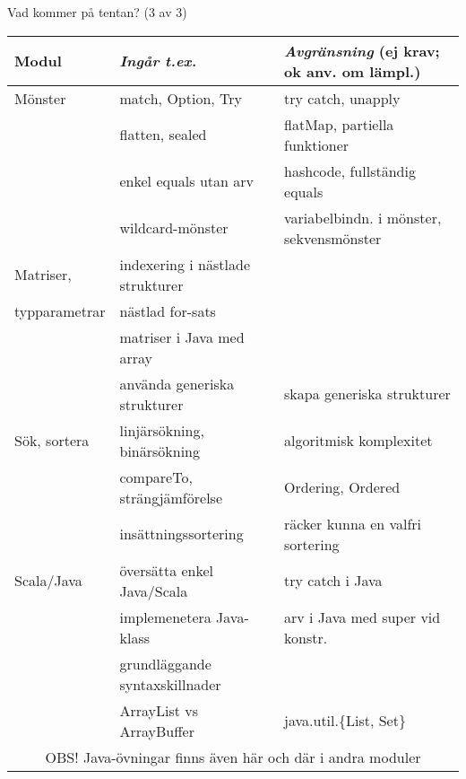 \begin{Slide}{Vad kommer på tentan? (3 av 3)}\SlideFontTiny
\hspace{-2em}\begin{minipage}{1.0\textwidth}
\begin{tabular}{l | l | l}
\textbf{Modul} & \textit{Ingår t.ex.}& \textit{Avgränsning} (ej krav; ok anv. om lämpl.)\\\hline

Mönster     & match, Option, Try & try catch, unapply\\
            & flatten, sealed            & flatMap, partiella funktioner\\
            & enkel equals utan arv     & hashcode, fullständig equals   \\ 
            & wildcard-mönster  & variabelbindn. i mönster, sekvensmönster\\
\hline

Matriser,     & indexering i nästlade strukturer & \\
typparametrar & nästlad for-sats  & \\ 
              & matriser i Java med array  & \\
              & använda generiska strukturer & skapa generiska strukturer\\ 
\hline

Sök, sortera & linjärsökning, binärsökning & algoritmisk komplexitet\\
            & compareTo, strängjämförelse & Ordering, Ordered\\
            & insättningssortering & räcker kunna en valfri sortering \\
\hline


Scala/Java & översätta enkel Java/Scala & try catch i Java \\
           & implemenetera Java-klass     &  arv i Java med super vid konstr.\\
           & grundläggande syntaxskillnader & \\
           & ArrayList vs ArrayBuffer & java.util.\{List, Set\}\\
\multicolumn{3}{c}{OBS! Java-övningar finns även här och där i andra moduler}\\
\hline           
     
\end{tabular}
\end{minipage}
\end{Slide}




